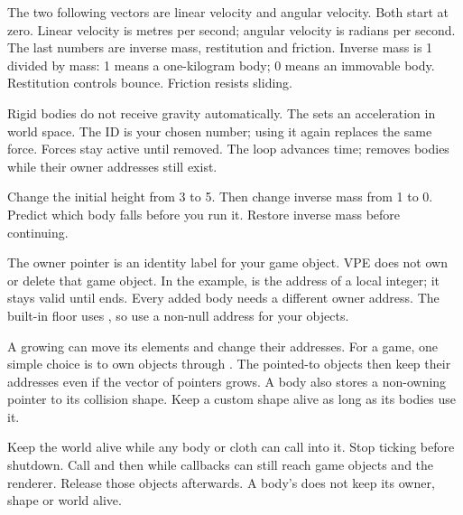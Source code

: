 \documentclass[11pt,a4paper]{article}
\begin{document}
The two following vectors are linear velocity and angular velocity. Both start at zero. Linear velocity is metres per second; angular velocity is radians per second. The last numbers are inverse mass, restitution and friction. Inverse mass is 1 divided by mass: 1 means a one-kilogram body; 0 means an immovable body. Restitution controls bounce. Friction resists sliding.

Rigid bodies do not receive gravity automatically. The  sets an acceleration in world space. The  ID is your chosen number; using it again replaces the same force. Forces stay active until removed. The loop advances time;  removes bodies while their owner addresses still exist.

\begin{tryit}Change the initial height from 3 to 5. Then change inverse mass from 1 to 0. Predict which body falls before you run it. Restore inverse mass before continuing.\end{tryit}
The owner pointer is an identity label for your game object. VPE does not own or delete that game object. In the example,  is the address of a local integer; it stays valid until  ends. Every added body needs a different owner address. The built-in floor uses , so use a non-null address for your objects.

A growing  can move its elements and change their addresses. For a game, one simple choice is to own objects through . The pointed-to objects then keep their addresses even if the vector of pointers grows. A body also stores a non-owning pointer to its collision shape. Keep a custom shape alive as long as its bodies use it.

Keep the world alive while any body or cloth can call into it. Stop ticking before shutdown. Call  and then  while callbacks can still reach game objects and the renderer. Release those objects afterwards. A body's  does not keep its owner, shape or world alive.
\end{document}
